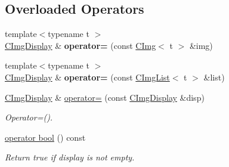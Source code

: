 \subsection*{Overloaded Operators}
\label{_amgrp10ba48134b3a5986e7dba07127eb6a73}
 \begin{DoxyCompactItemize}
\item 
\hypertarget{structcimg__library_1_1CImgDisplay_a2f9f3b13982f0236e8715021cfcd7778}{
{\footnotesize template$<$typename t $>$ }\\\hyperlink{structcimg__library_1_1CImgDisplay}{CImgDisplay} \& {\bfseries operator=} (const \hyperlink{structcimg__library_1_1CImg}{CImg}$<$ t $>$ \&img)}
\label{structcimg__library_1_1CImgDisplay_a2f9f3b13982f0236e8715021cfcd7778}

\item 
\hypertarget{structcimg__library_1_1CImgDisplay_ab92fbd4797afead8af055fe24e240e19}{
{\footnotesize template$<$typename t $>$ }\\\hyperlink{structcimg__library_1_1CImgDisplay}{CImgDisplay} \& {\bfseries operator=} (const \hyperlink{structcimg__library_1_1CImgList}{CImgList}$<$ t $>$ \&list)}
\label{structcimg__library_1_1CImgDisplay_ab92fbd4797afead8af055fe24e240e19}

\item 
\hypertarget{structcimg__library_1_1CImgDisplay_a81d1882a4d7d0579298fe6fc706fca40}{
\hyperlink{structcimg__library_1_1CImgDisplay}{CImgDisplay} \& \hyperlink{structcimg__library_1_1CImgDisplay_a81d1882a4d7d0579298fe6fc706fca40}{operator=} (const \hyperlink{structcimg__library_1_1CImgDisplay}{CImgDisplay} \&disp)}
\label{structcimg__library_1_1CImgDisplay_a81d1882a4d7d0579298fe6fc706fca40}

\begin{DoxyCompactList}\small\item\em Operator=(). \item\end{DoxyCompactList}\item 
\hypertarget{structcimg__library_1_1CImgDisplay_aa385aa18f5e42db5a415c25a90f4193d}{
\hyperlink{structcimg__library_1_1CImgDisplay_aa385aa18f5e42db5a415c25a90f4193d}{operator bool} () const }
\label{structcimg__library_1_1CImgDisplay_aa385aa18f5e42db5a415c25a90f4193d}

\begin{DoxyCompactList}\small\item\em Return true if display is not empty. \item\end{DoxyCompactList}\end{DoxyCompactItemize}
